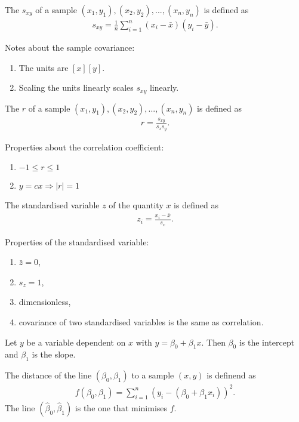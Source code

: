 \documentclass{article}
\begin{document}
\begin{definition}
	The  $s_{xy}$ of a sample $(x_1, y_1), (x_2, y_2), ..., (x_n, y_n)$
	is defined as
	\begin{align*}
		s_{xy} = \frac{1}{n}\sum_{i=1}^n (x_i - \bar x)(y_i - \bar y).
	\end{align*}
\end{definition}
Notes about the sample covariance:
\begin{enumerate}
	\item The units are $[x][y]$.
	\item Scaling the units linearly scales $s_{xy}$ linearly.
\end{enumerate}
\begin{definition}
	The  $r$ of a sample $(x_1, y_1), (x_2, y_2), ..., (x_n, y_n)$ is defined as
	\begin{align*}
		r = \frac{s_{xy}}{s_x s_y}.
	\end{align*}
\end{definition}
Properties about the correlation coefficient:
\begin{enumerate}
	\item $-1 \leq r \leq 1$
	\item $y=cx \Rightarrow |r|=1$
\end{enumerate}
\begin{definition}
	The standardised variable $z$ of the quantity $x$ is defined as
	\begin{align*}
		z_i = \frac{x_i-\bar x}{s_x}.
	\end{align*}
\end{definition}
Properties of the standardised variable:
\begin{enumerate}
	\item $\bar z = 0$,
	\item $s_z = 1$,
	\item dimensionless,
	\item covariance of two standardised variables is the same as correlation.
\end{enumerate}
\begin{definition}
	Let $y$ be a variable dependent on $x$ with $y=\beta_0 + \beta_1 x$. Then
	$\beta_0$ is the intercept and $\beta_1$ is the slope.
\end{definition}
\begin{definition}
	The distance of the line $(\beta_0,\beta_1)$ to a sample $(x,y)$ is definend as
	\begin{align*}
		f(\beta_0, \beta_1) = \sum_{i=1}^n (y_i -(\beta_0 + \beta_1 x_i))^2.
	\end{align*}
	The line $(\hat\beta_0, \hat\beta_1)$ is the one that minimises $f$.
\end{definition}
\end{document}

